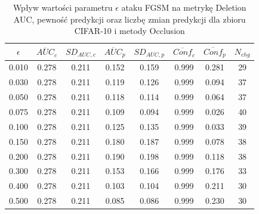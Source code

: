 \begin{table}[H] \centering \caption{Wpływ wartości parametru \(\epsilon\) ataku FGSM na metrykę Deletion AUC, pewność predykcji oraz liczbę zmian predykcji dla zbioru CIFAR-10 i metody Occlusion} \label{tab:occ_fgsm_auc_conf_cifar10} \begin{tabular}{cccccccc} \toprule $\epsilon$ & $\overline{AUC}_{c}$ & $SD_{AUC,c}$ & $\overline{AUC}_{p}$ & $SD_{AUC,p}$ & $\overline{Conf}_{c}$ & $\overline{Conf}_{p}$ & $N_{chg}$ \\ \midrule 0.010 & 0.278 & 0.211 & 0.152 & 0.159 & 0.999 & 0.281 & 29 \\ 0.030 & 0.278 & 0.211 & 0.119 & 0.126 & 0.999 & 0.094 & 37 \\ 0.050 & 0.278 & 0.211 & 0.118 & 0.114 & 0.999 & 0.064 & 37 \\ 0.075 & 0.278 & 0.211 & 0.109 & 0.094 & 0.999 & 0.026 & 40 \\ 0.100 & 0.278 & 0.211 & 0.125 & 0.135 & 0.999 & 0.033 & 39 \\ 0.150 & 0.278 & 0.211 & 0.180 & 0.187 & 0.999 & 0.078 & 38 \\ 0.200 & 0.278 & 0.211 & 0.190 & 0.198 & 0.999 & 0.118 & 38 \\ 0.300 & 0.278 & 0.211 & 0.153 & 0.166 & 0.999 & 0.176 & 33 \\ 0.400 & 0.278 & 0.211 & 0.103 & 0.104 & 0.999 & 0.211 & 30 \\ 0.500 & 0.278 & 0.211 & 0.085 & 0.086 & 0.999 & 0.230 & 30 \\ \bottomrule \end{tabular} \end{table}
